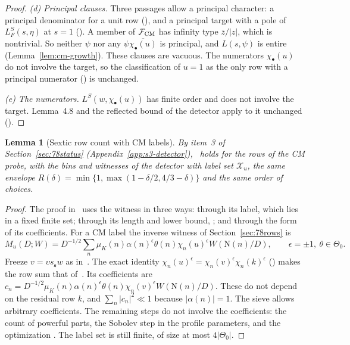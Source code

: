 \documentclass[11pt]{article}
\numberwithin{equation}{section}
\newcommand{\N}{\mathrm N}
\newcommand{\muk}{\mu_K}
\newtheorem{lemma}{Lemma}
\begin{document}
\begin{proof}
\emph{(d) Principal clauses.} Three passages allow a principal character: a principal denominator for a unit
row (\cite[Section~10.1; proof of Lemma~10.6]{OAI78}), and a principal target with a pole of $L_F^S(s,\eta)$ at $s=1$ (\cite[proof of Lemma~10.5]{OAI78}). A member of $\mathcal F_{\rm CM}$ has infinity type $\bar z/|z|$, which is nontrivial. So neither
$\psi$ nor any $\psi\overline{\chi_\bullet(u)}$ is principal, and $L(s,\psi)$ is entire
(Lemma~\ref{lem:cm-growth}). These clauses are vacuous. The numerators $\chi_\bullet(u)$ do not involve the
target, so the classification of $u=1$ as the only row with a principal numerator (\cite[Section~10.1]{OAI78}) is unchanged.

\emph{(e) The numerators.} $L^S(w,\chi_\bullet(u))$ has finite order and does not involve the target.
Lemma~4.8 and the reflected bound of the detector apply to it unchanged (\cite[Section~10.5; proof of Lemma~10.6]{OAI78}).
\end{proof}

\begin{lemma}[Sextic row count with CM labels]\label{lem:s6-sextic}
By item~3 of Section~\ref{sec:78status} (Appendix~\ref{app:s3-detector}),~\cite[Prop.~9.2]{OAI78}
holds for the rows
of the CM probe, with the bins and witnesses of the detector with label set $\mathcal X_u$, the same envelope
$R(\delta)=\min\{1,\max(1-\delta/2,4/3-\delta)\}$ and the same order of choices.
\end{lemma}

\begin{proof}
The proof in~\cite[proof of Proposition~9.2]{OAI78} uses the witness in three ways: through its label, which lies in a fixed
finite set; through its length and lower bound, \cite[eq.~(9.17)]{OAI78}; and through the form of its
coefficients. For a CM label the inverse witness of Section~\ref{sec:78rows} is
\begin{equation}\label{eq:d197}
 M_u(D;W)=D^{-1/2}\sum_n\muk(n)\alpha(n)^{\epsilon}\theta(n)\chi_n(u)^{\epsilon}W(\N(n)/D),
 \qquad\epsilon=\pm1,\ \theta\in\Theta_0 .
\end{equation}
Freeze $v=\upsilon s_{\mathfrak s}w$ as in~\cite[proof of Proposition~9.2]{OAI78}. The exact identity
$\chi_n(u)^\epsilon=\chi_n(v)^\epsilon\chi_n(k)^\epsilon$ (\cite[eq.~(9.20)]{OAI78}) makes the row sum that of~\cite[Lemma~9.1]{OAI78}.
Its coefficients are $c_n=D^{-1/2}\muk(n)\alpha(n)^\epsilon\theta(n)\chi_n(v)^\epsilon W(\N(n)/D)$. These do not depend on the
residual row $k$, and $\sum_n|c_n|^2\ll1$ because $|\alpha(n)|=1$. The sieve allows arbitrary coefficients. The
remaining steps do not involve the coefficients: the count of powerful parts, the Sobolev step in the profile
parameters, and the optimization \cite[eq.~(9.24)]{OAI78}. The label set is still finite, of size at
most $4|\Theta_0|$.
\end{proof}
\end{document}
